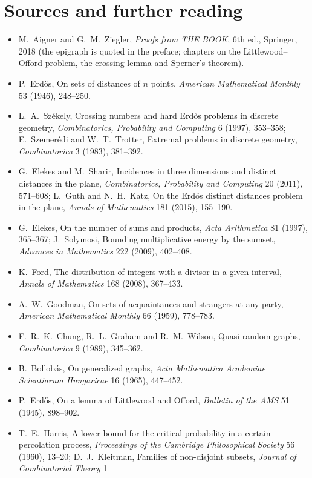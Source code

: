 \section*{Sources and further reading}

\begin{itemize}
\item M.~Aigner and G.~M.~Ziegler, \emph{Proofs from THE BOOK}, 6th ed., Springer, 2018 (the epigraph is quoted in the preface; chapters
on the Littlewood--Offord problem, the crossing lemma and Sperner's theorem).
\item P.~Erdős, On sets of distances of $n$ points, \emph{American Mathematical Monthly} 53 (1946), 248--250.
\item L.~A.~Székely, Crossing numbers and hard Erdős problems in discrete geometry, \emph{Combinatorics, Probability and Computing} 6
(1997), 353--358; E.~Szemerédi and W.~T.~Trotter, Extremal problems in discrete geometry, \emph{Combinatorica} 3 (1983), 381--392.
\item G.~Elekes and M.~Sharir, Incidences in three dimensions and distinct distances in the plane, \emph{Combinatorics, Probability and
Computing} 20 (2011), 571--608; L.~Guth and N.~H.~Katz, On the Erdős distinct distances problem in the plane, \emph{Annals of
Mathematics} 181 (2015), 155--190.
\item G.~Elekes, On the number of sums and products, \emph{Acta Arithmetica} 81 (1997), 365--367; J.~Solymosi, Bounding multiplicative
energy by the sumset, \emph{Advances in Mathematics} 222 (2009), 402--408.
\item K.~Ford, The distribution of integers with a divisor in a given interval, \emph{Annals of Mathematics} 168 (2008), 367--433.
\item A.~W.~Goodman, On sets of acquaintances and strangers at any party, \emph{American Mathematical Monthly} 66 (1959), 778--783.
\item F.~R.~K.~Chung, R.~L.~Graham and R.~M.~Wilson, Quasi-random graphs, \emph{Combinatorica} 9 (1989), 345--362.
\item B.~Bollobás, On generalized graphs, \emph{Acta Mathematica Academiae Scientiarum Hungaricae} 16 (1965), 447--452.
\item P.~Erdős, On a lemma of Littlewood and Offord, \emph{Bulletin of the AMS} 51 (1945), 898--902.
\item T.~E.~Harris, A lower bound for the critical probability in a certain percolation process, \emph{Proceedings of the Cambridge
Philosophical Society} 56 (1960), 13--20; D.~J.~Kleitman, Families of non-disjoint subsets, \emph{Journal of Combinatorial Theory} 1

\end{itemize}
